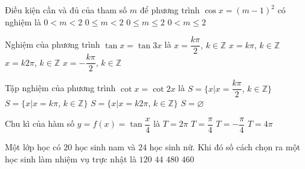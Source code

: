 \begin{ex}%
Điều kiện cần và đủ của tham số $m$ để phương trình $\cos x=(m-1)^2$ có nghiệm là
	\choice
	{$0<m<2$}
	{$0\le m<2$}
	{\True $0\le m\le 2$}
	{$0<m\le2$}
\end{ex}
\begin{ex}%
Nghiệm của phương trình $\tan x=\tan3x$ là 
	\choice
	{$x=\dfrac{k\pi}{2}$, $k\in\mathbb{Z}$}
	{\True $x=k\pi$, $k\in\mathbb{Z}$}
	{$x=k2\pi$, $k\in\mathbb{Z}$}
	{$x=-\dfrac{k\pi}{2}$, $k\in\mathbb{Z}$}
\end{ex}
\begin{ex}%
Tập nghiệm của phương trình $\cot x=\cot2x$ là 	
	\choice
	{$S=\Bigg\{x\big|x=\dfrac{k\pi}{2}$, $k\in\mathbb{Z}\Bigg\}$}
	{$S=\Bigg\{x\big|x=k\pi$, $k\in\mathbb{Z}\Bigg\}$}
	{$S=\Bigg\{x\big|x=k2\pi$, $k\in\mathbb{Z}\Bigg\}$}
	{\True $S=\varnothing$ }
\end{ex}
\begin{ex}%
Chu kì của hàm số $y=f(x)=\tan\dfrac{x}{4}$ là 	
	\choice
	{$T=2\pi$}
	{$T=\dfrac{\pi}{4}$}
	{$T=-\dfrac{\pi}{4}$}
	{\True $T=4\pi$}
\end{ex}
\begin{ex}%
Một lớp học có $20$ học sinh nam và $24$ học sinh nữ. Khi đó số cách chọn ra một học sinh làm nhiệm vụ trực nhật là
	\choice
	{$ 120 $}
	{\True $ 44 $}
	{$ 480 $}
	{$ 460 $}
\end{ex}
